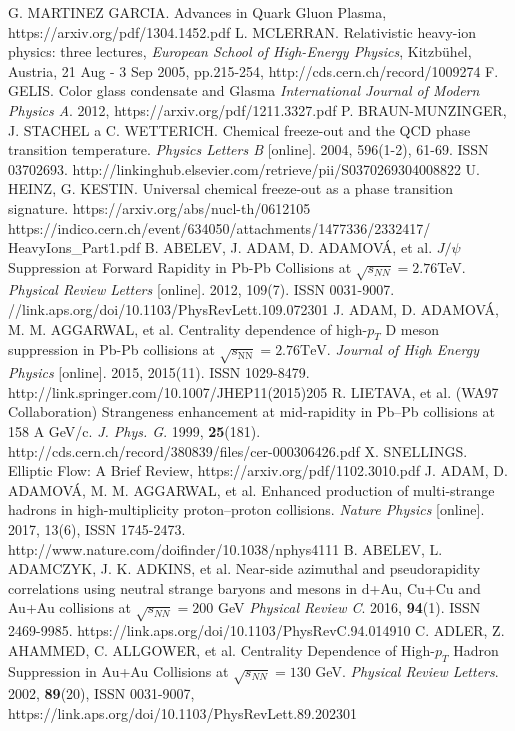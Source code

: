 \documentclass[thesismargins, thesislinespacing]{rnthesis}
\begin{document}
\begin{thebibliography}{}
G. MARTINEZ GARCIA. Advances in Quark Gluon Plasma, https://arxiv.org/pdf/1304.1452.pdf
L.  MCLERRAN. Relativistic heavy-ion physics: three lectures, \textit{European School of High-Energy Physics}, Kitzbühel, Austria, 21 Aug - 3 Sep 2005, pp.215-254, http://cds.cern.ch/record/1009274
F. GELIS. Color glass condensate and Glasma \textit{International Journal of Modern Physics A}. 2012, https://arxiv.org/pdf/1211.3327.pdf
P. BRAUN-MUNZINGER, J. STACHEL a C. WETTERICH. Chemical freeze-out and the QCD phase transition temperature. \textit{Physics Letters B }[online]. 2004, 596(1-2), 61-69. ISSN 03702693. http://linkinghub.elsevier.com/retrieve/pii/S0370269304008822
U. HEINZ, G. KESTIN. Universal chemical freeze-out as a phase transition signature. https://arxiv.org/abs/nucl-th/0612105
https://indico.cern.ch/event/634050/attachments/1477336/2332417/ \-HeavyIons\_Part1.pdf
B. ABELEV, J. ADAM, D. ADAMOVÁ, et al. $J/\psi$ Suppression at Forward Rapidity in Pb-Pb Collisions at $\sqrt{s_{NN}} = 2.76 $TeV. \textit{Physical Review Letters} [online]. 2012, 109(7). ISSN 0031-9007. //link.aps.org/doi/10.1103/PhysRevLett.109.072301
J. ADAM, D. ADAMOVÁ, M. M. AGGARWAL, et al. Centrality dependence of high-$p_{T}$ D meson suppression in Pb-Pb collisions at $ \sqrt{s_{\mathrm{N}\mathrm{N}}}=2.76 \mathrm{TeV}$. \textit{Journal of High Energy Physics} [online]. 2015, 2015(11). ISSN 1029-8479. http://link.springer.com/10.1007/JHEP11(2015)205
R. LIETAVA,  et al. (WA97 Collaboration) Strangeness enhancement at mid-rapidity in Pb–Pb collisions at 158 A GeV/c. \textit{J. Phys. G}. 1999,  \textbf{25}(181). http://cds.cern.ch/record/380839/files/cer-000306426.pdf 
 X. SNELLINGS. Elliptic Flow: A Brief Review, https://arxiv.org/pdf/1102.3010.pdf
 J. ADAM, D. ADAMOVÁ, M. M. AGGARWAL, et al. Enhanced production of multi-strange hadrons in high-multiplicity proton–proton collisions. \textit{Nature Physics }[online]. 2017, 13(6), ISSN 1745-2473. http://www.nature.com/doifinder/10.1038/nphys4111
B. ABELEV, L. ADAMCZYK, J. K. ADKINS, et al. Near-side azimuthal and pseudorapidity correlations using neutral strange baryons and mesons in d+Au, Cu+Cu and Au+Au collisions at $\sqrt{s_{NN}}=200$ GeV \textit{Physical Review C}. 2016, \textbf{94}(1). ISSN 2469-9985. https://link.aps.org/doi/10.1103/PhysRevC.94.014910
C. ADLER, Z. AHAMMED, C. ALLGOWER, et al. Centrality Dependence of High-$p_T$ Hadron Suppression in Au+Au Collisions at $\sqrt{s_{NN}} = 130$ GeV. \textit{Physical Review Letters}. 2002, \textbf{89}(20), ISSN 0031-9007, https://link.aps.org/doi/10.1103/PhysRevLett.89.202301

\end{thebibliography}
\end{document}
